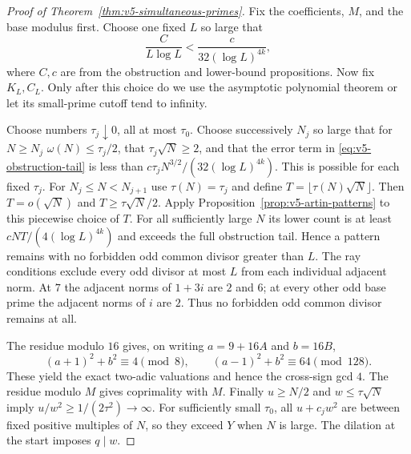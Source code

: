 \documentclass[11pt]{article}
\theoremstyle{definition}
\theoremstyle{remark}
\begin{document}
\begin{proof}[Proof of Theorem~\ref{thm:v5-simultaneous-primes}]
Fix the coefficients, $M$, and the base modulus first. Choose one fixed
$L$ so large that
\[
 \frac C{L\log L}<\frac c{32(\log L)^{4k}},
\]
where $C,c$ are from the obstruction and lower-bound propositions.
Now fix $K_L,C_L$. Only after this choice do we use the asymptotic
polynomial theorem or let its small-prime cutoff tend to infinity.

Choose numbers $\tau_j\downarrow0$, all at most $\tau_0$.
Choose successively $N_j$ so large that for $N\geq N_j$
$\omega(N)\leq\tau_j/2$,
that $\tau_j\sqrt N\geq2$, and that the error term in
\eqref{eq:v5-obstruction-tail} is less than
$c\tau_jN^{3/2}/(32(\log L)^{4k})$.
This is possible for each fixed $\tau_j$.
For $N_j\leq N<N_{j+1}$ use $\tau(N)=\tau_j$ and define
$T=\lfloor\tau(N)\sqrt N\rfloor$.
Then $T=o(\sqrt N)$ and $T\geq\tau\sqrt N/2$.
Apply Proposition~\ref{prop:v5-artin-patterns} to this piecewise choice
of $T$. For all sufficiently large $N$ its lower count is at least
$cNT/(4(\log L)^{4k})$ and exceeds the full obstruction tail.
Hence a pattern remains with no forbidden odd
common divisor greater than $L$.
The ray conditions exclude every odd divisor at most $L$ from each
individual adjacent norm. At $7$ the adjacent norms of $1+3i$ are $2$
and $6$; at every other odd base prime the adjacent norms of $i$ are $2$.
Thus no forbidden odd common divisor remains at all.

The residue modulo $16$ gives, on writing $a=9+16A$ and $b=16B$,
\[
 (a+1)^2+b^2\equiv4\pmod8,\qquad
 (a-1)^2+b^2\equiv64\pmod{128}.
\]
These yield the exact two-adic valuations and hence the cross-sign gcd
$4$. The residue modulo $M$ gives coprimality with $M$.
Finally $u\geq N/2$ and $w\leq\tau\sqrt N$ imply
$u/w^2\geq1/(2\tau^2)\to\infty$.
For sufficiently small $\tau_0$, all $u+c_jw^2$ are between fixed positive
multiples of $N$, so they exceed $Y$ when $N$ is large.
The dilation at the start imposes $q\mid w$.
\end{proof}
\end{document}
